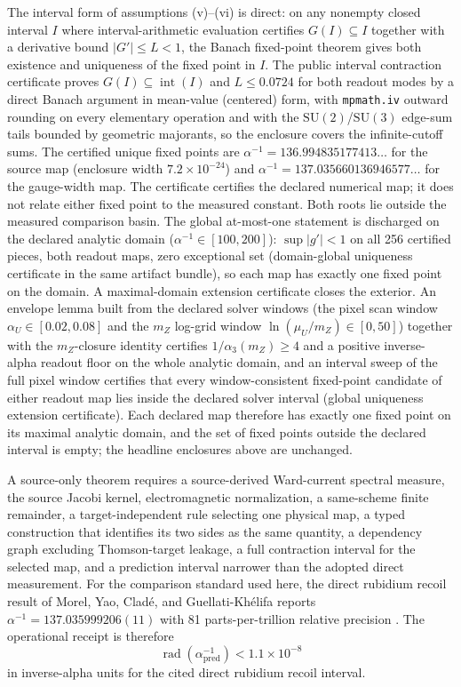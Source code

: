 \documentclass[11pt]{article}
\theoremstyle{remark}
\newcommand{\SU}{\mathrm{SU}}
\begin{document}
The interval form of assumptions (v)--(vi) is direct: on any nonempty closed interval \(I\)
where interval-arithmetic evaluation
certifies \(G(I)\subseteq I\) together with a derivative bound
\(|G'|\le L<1\), the Banach fixed-point theorem gives both existence and
uniqueness of the fixed point in \(I\). The public interval contraction certificate
\cite{oph-code}
proves \(G(I)\subseteq\operatorname{int}(I)\) and \(L\le0.0724\) for both
readout modes by a direct Banach argument in mean-value (centered) form, with
\texttt{mpmath.iv} outward rounding on every elementary operation and with the
\(\SU(2)\)/\(\SU(3)\) edge-sum tails bounded by geometric majorants, so the
enclosure covers the infinite-cutoff sums. The certified unique fixed points
are \(\alpha^{-1}=136.994835177413\ldots\) for the source map (enclosure width
\(7.2\times10^{-24}\)) and \(\alpha^{-1}=137.035660136946577\ldots\) for the
gauge-width map. The certificate certifies the declared numerical map; it does
not relate either fixed point to the measured constant. Both roots lie outside
the measured comparison basin. The global at-most-one statement is
discharged on the declared analytic domain (\(\alpha^{-1}\in[100,200]\)):
\(\sup|g'|<1\) on all 256 certified pieces, both readout maps, zero
exceptional set
(domain-global uniqueness certificate in the same artifact bundle), so
each map has exactly one fixed point on the domain.
A maximal-domain extension certificate closes the exterior. An envelope
lemma built from the declared solver windows (the pixel scan window
\(\alpha_U\in[0.02,0.08]\) and the \(m_Z\) log-grid window
\(\ln(\mu_U/m_Z)\in[0,50]\)) together with the \(m_Z\)-closure identity
certifies \(1/\alpha_3(m_Z)\ge 4\) and a positive inverse-alpha readout
floor on the whole analytic domain, and an interval sweep of the full pixel
window certifies that every window-consistent fixed-point candidate of
either readout map lies inside the declared solver interval
(global uniqueness extension certificate).
Each declared map therefore has exactly one fixed point on its maximal
analytic domain, and the set of fixed points outside the declared interval
is empty; the headline enclosures above are unchanged.

A source-only theorem requires a source-derived Ward-current spectral measure, the source Jacobi
kernel, electromagnetic normalization, a same-scheme finite remainder, a
target-independent rule selecting one physical map, a typed construction that
identifies its two sides as the same quantity, a dependency graph excluding
Thomson-target leakage, a full contraction interval for the selected map, and
a prediction interval narrower than the adopted direct measurement. For the comparison standard used here, the direct rubidium recoil
result of Morel, Yao, Cladé, and Guellati-Khélifa reports
\(\alpha^{-1}=137.035999206(11)\) with 81 parts-per-trillion relative precision
\cite{morel2020}. The operational receipt is therefore
\[
\operatorname{rad}(\alpha_{\mathrm{pred}}^{-1})<1.1\times10^{-8}
\]
in inverse-alpha units for the cited direct rubidium recoil interval.
\end{document}
